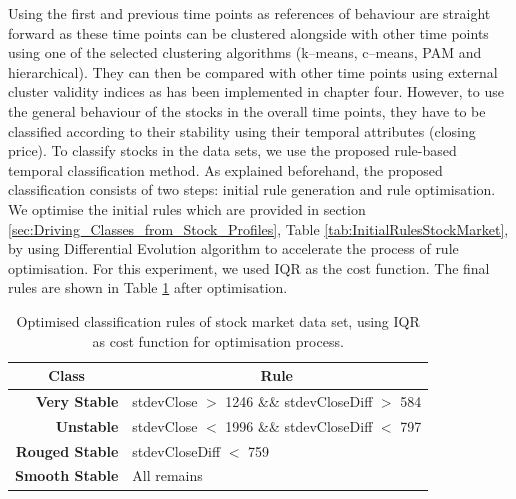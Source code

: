 Using the first and previous time points as references of behaviour are straight forward as these time points can be clustered alongside with other time points using one of the selected clustering algorithms (k--means, c--means, PAM and hierarchical). They can then be compared with other time points using external cluster validity indices as has been implemented in chapter four. However, to use the general behaviour of the stocks in the overall time points, they have to be classified according to their stability using their temporal attributes (closing price). To classify stocks in the data sets, we use the proposed rule-based temporal classification method. As explained beforehand, the proposed classification consists of two steps: initial rule generation and rule optimisation. We optimise the initial rules which are provided in section \ref{sec:Driving_Classes_from_Stock_Profiles}, Table \ref{tab:InitialRulesStockMarket}, by using Differential Evolution algorithm  to accelerate the process of rule optimisation. For this experiment, we used IQR as the cost function. The final rules are shown in Table \ref{tab:OptimisedRulesStockMarket} after optimisation.

\begin{table}[!h]
    \small
    \centering
    \caption{Optimised classification rules of stock market data set, using IQR as cost function for optimisation process.}
    \label{tab:OptimisedRulesStockMarket}
    \begin{tabular}{rl}
        \toprule
        \multicolumn{1}{c}{Class} & \multicolumn{1}{c}{\textbf{Rule}} \\ 
        
        \midrule
        
        \textbf{Very Stable} & stdevClose $ > $ 1246 \&\& stdevCloseDiff $ > $ 584   \\
        
        \textbf{Unstable}    & stdevClose $ < $ 1996 \&\& stdevCloseDiff $ < $ 797   \\
        
        \textbf{Rouged Stable}                & stdevCloseDiff $ < $ 759        \\ 
        
        \textbf{Smooth Stable}                &  All remains                        \\
        \bottomrule 
    \end{tabular}
\end{table}

